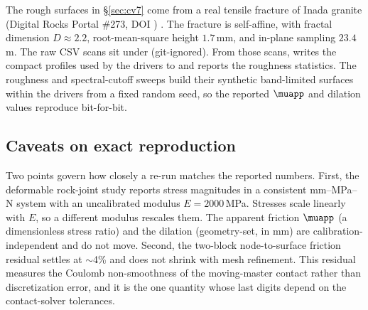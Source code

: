 The rough surfaces in \S\ref{sec:cv7} come from a real tensile fracture of Inada granite
(Digital Rocks Portal \#273, DOI ) \citep{inada2020digitalrocks}.
The fracture is self-affine, with fractal dimension $D\!\approx\!2.2$, root-mean-square height
$1.7$\,mm, and in-plane sampling $23.4$\,\textmu m. The raw CSV scans sit under
 (git-ignored). From those scans,
 writes the compact profiles used by the
drivers to  and reports the roughness statistics. The roughness
and spectral-cutoff sweeps build their synthetic band-limited surfaces within the drivers
from a fixed random seed, so the reported $\muapp$ and dilation values reproduce
bit-for-bit.

\subsection{Caveats on exact reproduction}

Two points govern how closely a re-run matches the reported numbers. First, the deformable
rock-joint study reports stress magnitudes in a consistent mm--MPa--N system with an
uncalibrated modulus $E=2000$\,MPa. Stresses scale linearly with $E$, so a different
modulus rescales them. The apparent friction $\muapp$ (a dimensionless stress ratio)
and the dilation (geometry-set, in mm) are calibration-independent and do not move. Second,
the two-block node-to-surface friction residual settles at $\sim$4\% and does not shrink with
mesh refinement. This residual measures the Coulomb non-smoothness of the moving-master
contact rather than discretization error, and it is the one quantity whose last digits depend
on the contact-solver tolerances.

